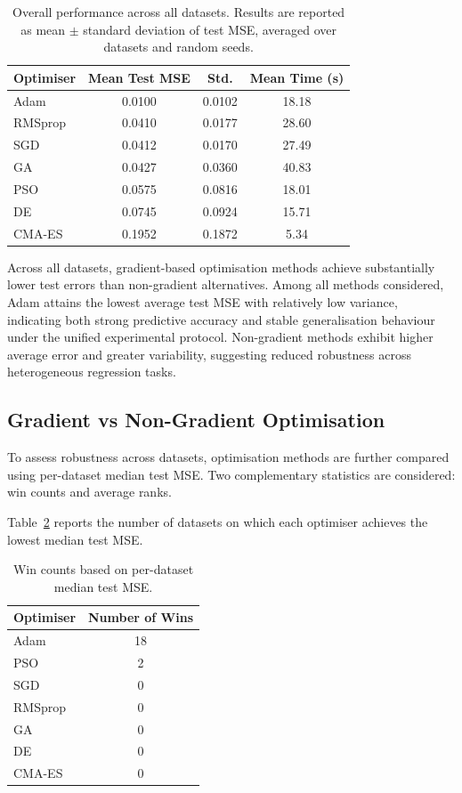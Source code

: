 \documentclass[a4paper,12pt,oneside]{article}
\begin{document}
\begin{table}[H]
\centering
\caption{Overall performance across all datasets. Results are reported as mean $\pm$ standard deviation of test MSE, averaged over datasets and random seeds.}
\label{tab:overall_results}
\begin{tabular}{lccc}
\toprule
\textbf{Optimiser} & \textbf{Mean Test MSE} & \textbf{Std.} & \textbf{Mean Time (s)} \\
\midrule
Adam      & 0.0100 & 0.0102 & 18.18 \\
RMSprop   & 0.0410 & 0.0177 & 28.60 \\
SGD       & 0.0412 & 0.0170 & 27.49 \\
GA        & 0.0427 & 0.0360 & 40.83 \\
PSO       & 0.0575 & 0.0816 & 18.01 \\
DE        & 0.0745 & 0.0924 & 15.71 \\
CMA-ES    & 0.1952 & 0.1872 & 5.34 \\
\bottomrule
\end{tabular}
\end{table}

Across all datasets, gradient-based optimisation methods achieve substantially lower test errors than non-gradient alternatives. Among all methods considered, Adam attains the lowest average test MSE with relatively low variance, indicating both strong predictive accuracy and stable generalisation behaviour under the unified experimental protocol. Non-gradient methods exhibit higher average error and greater variability, suggesting reduced robustness across heterogeneous regression tasks.

\subsection{Gradient vs Non-Gradient Optimisation}

To assess robustness across datasets, optimisation methods are further compared using per-dataset median test MSE. Two complementary statistics are considered: win counts and average ranks.

Table~\ref{tab:win_counts} reports the number of datasets on which each optimiser achieves the lowest median test MSE.

\begin{table}[H]
\centering
\caption{Win counts based on per-dataset median test MSE.}
\label{tab:win_counts}
\begin{tabular}{lc}
\toprule
\textbf{Optimiser} & \textbf{Number of Wins} \\
\midrule
Adam      & 18 \\
PSO       & 2  \\
SGD       & 0  \\
RMSprop   & 0  \\
GA        & 0  \\
DE        & 0  \\
CMA-ES    & 0  \\
\bottomrule
\end{tabular}
\end{table}
\end{document}
